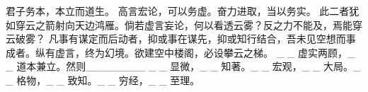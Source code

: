 \documentclass{article}
\begin{document}
君子务本，本立而道生。
高言宏论，可以务虚。奋力进取，当以务实。
此二者犹如穿云之箭射向天边鸿雁。倘若虚言妄论，何以看透云雾？反之力不能及，焉能穿云破雾？
凡事有谋定而后动者，抑或事在谋先，抑或知行结合，吾未见空想而事成者。纵有虚言，终为幻境。欲建空中楼阁，必设攀云之梯。
_ _ 虚实两顾，_ _ 道本兼立。然则________
_ _ 显微，_ _ 知著。_ _ 宏观，_ _ 大局。_ _ 格物，_ _ 致知。_ _ 穷经，_ _ 至理。
\end{document}

